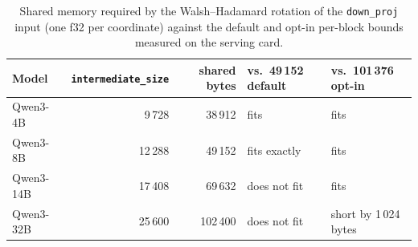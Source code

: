 \begin{table}[t]
\centering
\footnotesize
\setlength{\tabcolsep}{4pt}%
\begin{tabular}{lrrll}
\toprule
Model & \texttt{intermediate\_size} & shared bytes & vs.\ 49\,152 default & vs.\ 101\,376 opt-in \\
\midrule
Qwen3-4B  &  9\,728 &  38\,912 & fits & fits \\
Qwen3-8B  & 12\,288 &  49\,152 & fits exactly & fits \\
Qwen3-14B & 17\,408 &  69\,632 & does not fit & fits \\
Qwen3-32B & 25\,600 & 102\,400 & does not fit & short by 1\,024 bytes \\
\bottomrule
\end{tabular}
\caption{Shared memory required by the Walsh--Hadamard rotation of the
\texttt{down\_proj} input (one f32 per coordinate) against the default and
opt-in per-block bounds measured on the serving card.}
\label{tab:envelope}
\end{table}
